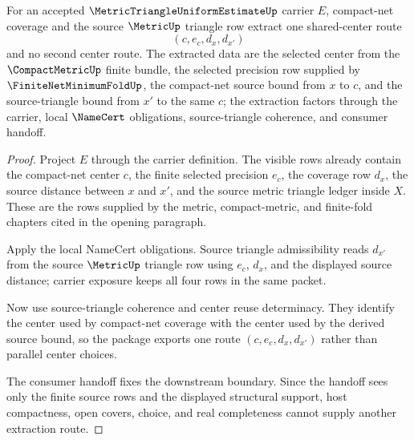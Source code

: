 \begin{theorem}
\label{thm:metric-triangle-uniform-estimate-compact-net-triangle-extraction}
For an accepted $\MetricTriangleUniformEstimateUp$ carrier $E$, compact-net coverage and the source $\MetricUp$ triangle row extract one shared-center route
$$
(c,e_c,d_x,d_{x'})
$$
and no second center route. The extracted data are the selected center from the $\CompactMetricUp$ finite bundle, the selected precision row supplied by $\FiniteNetMinimumFoldUp$, the compact-net source bound from $x$ to $c$, and the source-triangle bound from $x'$ to the same $c$; the extraction factors through the carrier, local $\NameCert$ obligations, source-triangle coherence, and consumer handoff.
\end{theorem}
\begin{proof}
Project $E$ through the carrier definition. The visible rows already contain the compact-net center $c$, the finite selected precision $e_c$, the coverage row $d_x$, the source distance between $x$ and $x'$, and the source metric triangle ledger inside $X$. These are the rows supplied by the metric, compact-metric, and finite-fold chapters cited in the opening paragraph.

Apply the local NameCert obligations. Source triangle admissibility reads $d_{x'}$ from the source $\MetricUp$ triangle row using $e_c$, $d_x$, and the displayed source distance; carrier exposure keeps all four rows in the same packet.

Now use source-triangle coherence and center reuse determinacy. They identify the center used by compact-net coverage with the center used by the derived source bound, so the package exports one route $(c,e_c,d_x,d_{x'})$ rather than parallel center choices.

The consumer handoff fixes the downstream boundary. Since the handoff sees only the finite source rows and the displayed structural support, host compactness, open covers, choice, and real completeness cannot supply another extraction route.
\end{proof}

